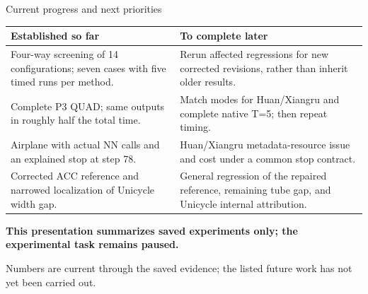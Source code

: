 \documentclass[aspectratio=169,11pt]{beamer}
\newcommand{\src}[1]{\par\vfill{\fontsize{7}{9}\selectfont\color{gray}#1\par}}
\begin{document}
\begin{frame}[t]{Current progress and next priorities}
\relax
\relax
{\small\renewcommand{\arraystretch}{1.18}\noindent\begin{tabularx}{\linewidth}{@{}X X@{}}\toprule
\textbf{Established so far} & \textbf{To complete later}\\\midrule
Four-way screening of 14 configurations; seven cases with five timed runs per method. & Rerun affected regressions for new corrected revisions, rather than inherit older results.\\
Complete P3 QUAD; same outputs in roughly half the total time. & Match modes for Huan/Xiangru and complete native T=5; then repeat timing.\\
Airplane with actual NN calls and an explained stop at step 78. & Huan/Xiangru metadata-resource issue and cost under a common stop contract.\\
Corrected ACC reference and narrowed localization of Unicycle width gap. & General regression of the repaired reference, remaining tube gap, and Unicycle internal attribution.\\
\bottomrule\end{tabularx}\par{}}\vspace{0.45cm}\textbf{This presentation summarizes saved experiments only; the experimental task remains paused.}
\src{Numbers are current through the saved evidence; the listed future work has not yet been carried out.}
\end{frame}
\end{document}
